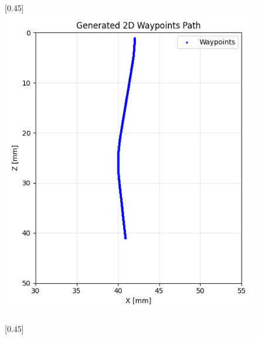 \begin{figure}[H]
    \centering
    \begin{subcaptionbox}{\label{fig:left}}[0.45\linewidth]
        {\includegraphics[width=\linewidth]{images/waypoints/smallcurves2.png}}
    \end{subcaptionbox}
    \hspace{0.05\linewidth}
    \begin{subcaptionbox}{\label{fig:right}}[0.45\linewidth]

\end{subcaptionbox}
\end{figure}
